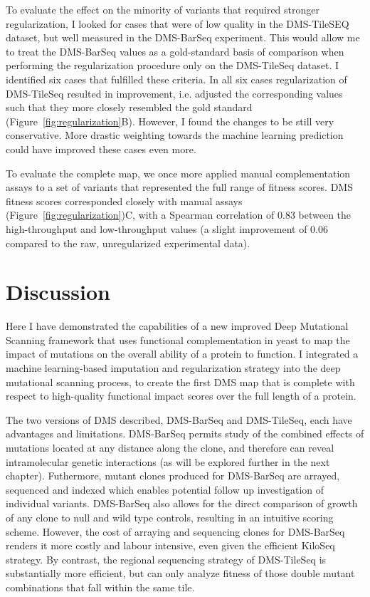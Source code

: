 To evaluate the effect on the minority of variants that required stronger regularization, I looked for cases that were of low quality in the DMS-TileSEQ dataset, but well measured in the DMS-BarSeq experiment. This would allow me to treat the DMS-BarSeq values as a gold-standard basis of comparison when performing the regularization procedure only on the DMS-TileSeq dataset. I identified six cases that fulfilled these criteria. In all six cases regularization of DMS-TileSeq resulted in improvement, i.e. adjusted the corresponding values such that they more closely resembled the gold standard (Figure~\ref{fig:regularization}B). However, I found the changes to be still very conservative. More drastic weighting towards the machine learning prediction could have improved these cases even more.

To evaluate the complete map, we once more applied manual complementation assays to a set of variants that represented the full range of fitness scores.  DMS fitness scores corresponded closely with manual assays (Figure~\ref{fig:regularization})C, with a Spearman correlation of 0.83 between the high-throughput and low-throughput values (a slight improvement of 0.06 compared to the raw, unregularized experimental data).


\section{Discussion}

Here I have demonstrated the capabilities of a new improved Deep Mutational Scanning framework that uses functional complementation in yeast to map the impact of mutations on the overall ability of a protein to function. I integrated a machine learning-based imputation and regularization strategy into the deep mutational scanning process, to create the first DMS map that is complete with respect to high-quality functional impact scores over the full length of a protein. 

The two versions of DMS described, DMS-BarSeq and DMS-TileSeq, each have advantages and limitations. DMS-BarSeq permits study of the combined effects of mutations located at any distance along the clone, and therefore can reveal intramolecular genetic interactions (as will be explored further in the next chapter).  Futhermore, mutant clones produced for DMS-BarSeq are arrayed, sequenced and indexed which enables potential follow up investigation of individual variants. DMS-BarSeq also allows for the direct comparison of growth of any clone to null and wild type controls, resulting in an intuitive scoring scheme. However, the cost of arraying and sequencing clones for DMS-BarSeq renders it more costly and labour intensive, even given the efficient KiloSeq strategy. By contrast, the regional sequencing strategy of DMS-TileSeq is substantially more efficient, but can only analyze fitness of those double mutant combinations that fall within the same tile. 

